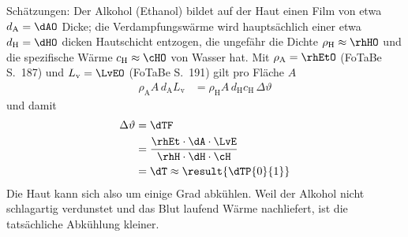 \begin{center}
\end{center}

Schätzungen: Der Alkohol (Ethanol) bildet auf der Haut einen Film von etwa $d_\text{A} = \dAO$ Dicke; die Verdampfungswärme wird hauptsächlich einer etwa $d_\text{H} = \dHO$ dicken Hautschicht entzogen, die ungefähr die Dichte $\rho_\text{H} \approx \rhHO$ und die spezifische Wärme $c_\text{H} \approx \cHO$ von Wasser hat. Mit $\rho_\text{A} = \rhEtO$ (FoTaBe S.~187) und $L_\text{v} = \LvEO$ (FoTaBe S.~191) gilt pro Fläche $A$
\begin{align}
 \rho_\text{A}A\,d_\text{A}L_\text{v} &= \rho_\text{H}A\,d_\text{H}c_\text{H}\,\Delta\vartheta
\end{align}
und damit
\begin{align}
 \Delta\vartheta &= \dTF \\
   &= \frac{\rhEt\cdot\dA\cdot\LvE}{\rhH\cdot\dH\cdot\cH} \\
   &= \dT \approx \result{\dTP{0}{1}}
\end{align}
Die Haut kann sich also um einige Grad abkühlen. Weil der Alkohol nicht schlagartig verdunstet und das Blut laufend Wärme nachliefert, ist die tatsächliche Abkühlung kleiner.
